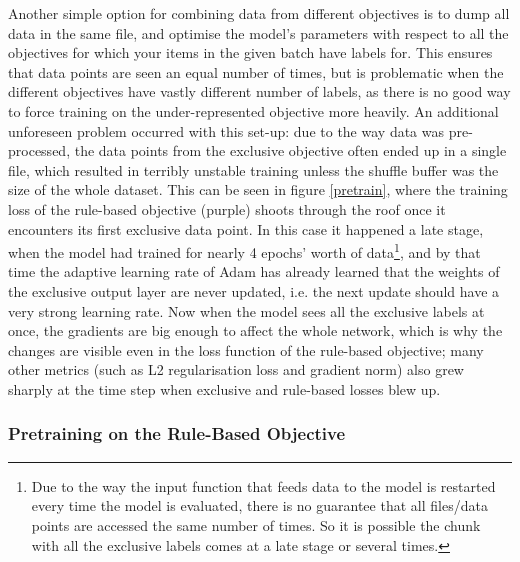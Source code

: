 Another simple option for combining data from different objectives is to dump all data in the same file, and optimise the model's parameters with respect to all the objectives for which your items in the given batch have labels for.
This ensures that data points are seen an equal number of times, but is problematic when the different objectives have vastly different number of labels, as there is no good way to force training on the under-represented objective more heavily.
An additional unforeseen problem occurred with this set-up: due to the way data was pre-processed, the data points from the exclusive objective often ended up in a single file, which resulted in terribly unstable training unless the shuffle buffer was the size of the whole dataset.
This can be seen in figure \ref{pretrain}, where the training loss of the rule-based objective (purple) shoots through the roof once it encounters its first exclusive data point.
In this case it happened a late stage, when the model had trained for nearly 4 epochs' worth of data\footnote{Due to the way the input function that feeds data to the model is restarted every time the model is evaluated, there is no guarantee that all files/data points are accessed the same number of times. So it is possible the chunk with all the exclusive labels comes at a late stage or several times.}, and by that time the adaptive learning rate of Adam has already learned that the weights of the exclusive output layer are never updated, i.e. the next update should have a very strong learning rate.
Now when the model sees all the exclusive labels at once, the gradients are big enough to affect the whole network, which is why the changes are visible even in the loss function of the rule-based objective; many other metrics (such as L2 regularisation loss and gradient norm) also grew sharply at the time step when exclusive and rule-based losses blew up.

\subsubsection{Pretraining on the Rule-Based Objective}

